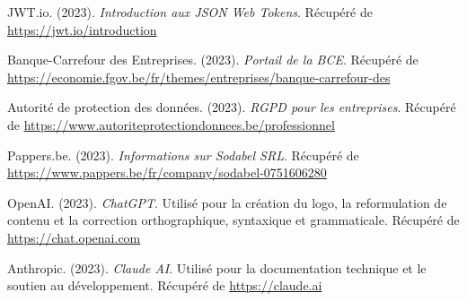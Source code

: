 \begin{thebibliography}{99}
JWT.io. (2023).
\textit{Introduction aux JSON Web Tokens}.
Récupéré de \url{https://jwt.io/introduction}

Banque-Carrefour des Entreprises. (2023).
\textit{Portail de la BCE}.
Récupéré de \url{https://economie.fgov.be/fr/themes/entreprises/banque-carrefour-des}

Autorité de protection des données. (2023).
\textit{RGPD pour les entreprises}.
Récupéré de \url{https://www.autoriteprotectiondonnees.be/professionnel}

Pappers.be. (2023).
\textit{Informations sur Sodabel SRL}.
Récupéré de \url{https://www.pappers.be/fr/company/sodabel-0751606280}

OpenAI. (2023).
\textit{ChatGPT}.
Utilisé pour la création du logo, la reformulation de contenu et la correction orthographique, syntaxique et grammaticale.
Récupéré de \url{https://chat.openai.com}

Anthropic. (2023).
\textit{Claude AI}.
Utilisé pour la documentation technique et le soutien au développement.
Récupéré de \url{https://claude.ai}

\end{thebibliography}
